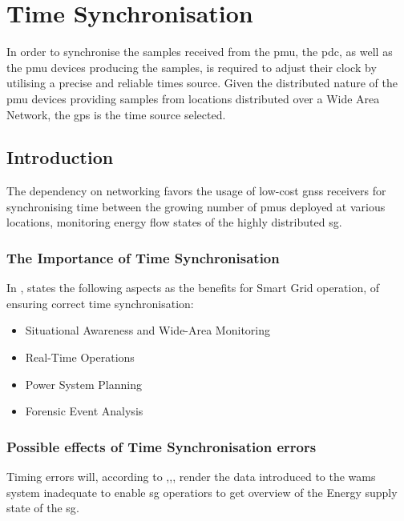 

\section{Time Synchronisation}
In order to synchronise the samples received from the \acrshort{pmu}, the \acrshort{pdc}, as well as the \acrshort{pmu} devices producing the samples, is required to adjust their clock by utilising a precise and reliable times source.  Given the distributed nature of the \acrshort{pmu} devices providing samples from locations distributed over a Wide Area Network, the \acrfull{gps} is the  time source selected. 

\subsection{Introduction}


The dependency on networking favors the usage of low-cost \acrshort{gnss} receivers for synchronising time between the growing number of \acrshort{pmu}s deployed at various locations, monitoring energy flow states of the highly distributed \acrshort{sg}. 



\subsubsection{The Importance of Time Synchronisation}

In \cite{dagle2019importance}, \citeauthor{dagle2019importance} states the following aspects as the benefits for Smart Grid operation, of ensuring correct time synchronisation:


\begin{itemize}
    \item  Situational Awareness and Wide-Area Monitoring
    \item  Real-Time Operations
    \item  Power System Planning 
    \item  Forensic Event Analysis
    
\end{itemize}

\subsubsection{Possible effects of Time Synchronisation errors}
Timing errors will, according to ,,, render the data introduced to the \acrshort{wams} system inadequate to enable \acrshort{sg} operatiors to get overview of the Energy supply state of the \acrshort{sg}.

